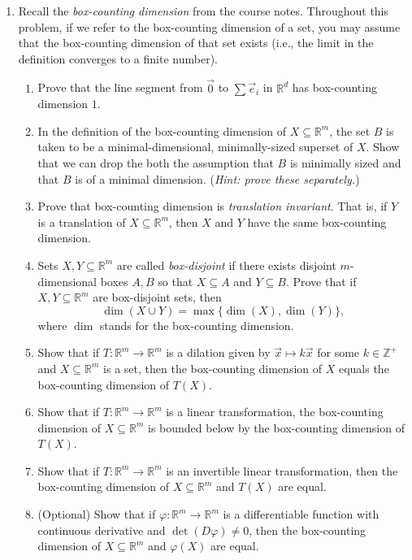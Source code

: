\documentclass[letter]{article}
\newcommand{\R}{\mathbb{R}}
\newcommand{\Z}{\mathbb{Z}}
\begin{document}
\begin{enumerate}
		\item Recall the \emph{box-counting dimension} from the course notes. Throughout this problem, if we
			refer to the box-counting dimension of a set, you may assume that the box-counting dimension of that
			set exists (i.e., the limit in the definition converges to a finite number).
			\begin{enumerate}
				\item Prove that the line segment from $\vec 0$ to $\sum \vec e_i$ in $\R^d$ has box-counting dimension $1$.
				\item In the definition of the box-counting dimension of $X\subseteq \R^m$, 
					the set $B$ is taken to be a minimal-dimensional, minimally-sized 
					superset of $X$. Show that we can drop the both the
					assumption that $B$ is minimally sized and that $B$ is of a minimal dimension. (\emph{Hint: 
					prove these separately.})
				\item Prove that box-counting dimension is \emph{translation invariant}. That is, if $Y$ is
					a translation of $X\subseteq\R^m$, then $X$ and $Y$ have the same box-counting dimension.
				\item Sets $X,Y\subseteq \R^m$ are called \emph{box-disjoint} if there exists disjoint $m$-dimensional
					boxes $A,B$ so that $X\subseteq A$ and $Y\subseteq B$.
					Prove that if $X,Y\subseteq \R^m$ are box-disjoint sets, then 
					\[
						\dim(X\cup Y) = \max\{\dim(X),\dim(Y)\},
					\]
					where $\dim$ stands for the box-counting dimension.
				\item Show that
					if $T:\R^m\to\R^m$ is a dilation given by $\vec x\mapsto k\vec x$ for some $k\in\Z^+$ 
					and $X\subseteq \R^m$ is a set, then
					the box-counting dimension of $X$ equals the box-counting dimension of $T(X)$.
				\item Show that if $T:\R^m\to\R^m$ is a linear transformation, the box-counting dimension of
					$X\subseteq \R^m$ is bounded below by the box-counting dimension of $T(X)$.
				\item Show that if $T:\R^m\to\R^m$ is an invertible linear transformation, then the box-counting
					dimension of $X\subseteq\R^m$ and $T(X)$ are equal.
				\item (Optional) Show that if $\varphi:\R^m\to\R^m$ is a differentiable function
					with continuous derivative
					and $\det(D\varphi)\neq 0$, then the box-counting dimension of $X\subseteq \R^m$ and
					$\varphi(X)$ are equal.
			\end{enumerate}


	\end{enumerate}
\end{document}
